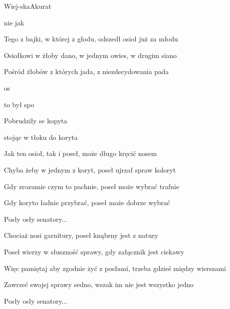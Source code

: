 \begin{song}{Wiej-ska}{}{}{Akurat}{}{}
  \begin{SBVerse}
     nie   jak 

    Tego z bajki, w której z głodu, odszedł osioł już za młodu

    Osiołkowi w żłoby dano, w jednym owies, w drugim siano

    Pośród żłobów z których jada, z niezdecydowania pada
  \end{SBVerse}
  \begin{SBChorus}
     os 

     to  był spo

    Pobrudziły se kopyta

    stojąc w tłoku do koryta
  \end{SBChorus}
  \begin{SBVerse}
    Jak ten osioł, tak i poseł, może długo kręcić nosem

    Chyba żeby w jednym z koryt, poseł ujrzał spraw koloryt

    Gdy zrozumie czym to pachnie, poseł może wybrać trafnie

    Gdy koryto ładnie przybrać, poseł może dobrze wybrać
  \end{SBVerse}
  \begin{SBChorus}
    Posły osły senatory...
  \end{SBChorus}
  \begin{SBVerse}
    Chociaż nosi garnitury, poseł knąbrny jest z natury

    Poseł wierzy w słuszność sprawy, gdy załącznik jest ciekawy

    Więc pamiętaj aby zgodnie żyć z posłami, trzeba gdzieś między wierszami

    Zawrzeć swojej sprawy sedno, wszak im nie jest wszystko jedno
  \end{SBVerse}
  \begin{SBChorus}
    Posły osły senatory...
  \end{SBChorus}
\end{song}
